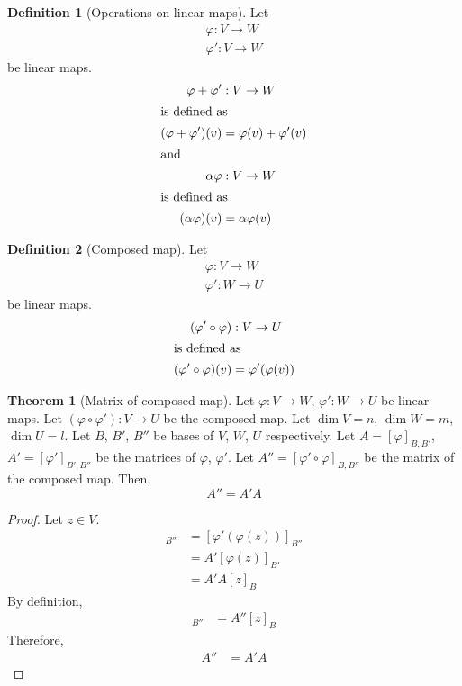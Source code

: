 \documentclass[fleqn, a4paper, 12pt]{article}
\theoremstyle{definition}
\newtheorem{definition}{Definition} %
\theoremstyle{theorem}
\newtheorem{theorem}{Theorem} %
\theoremstyle{remark}
\numberwithin{corollary}{theorem}
\numberwithin{equation}{theorem}
\begin{document}
\begin{definition}[Operations on linear maps]
	Let
	\begin{align*}
		\varphi : V \to W\\
		\varphi' : V \to W
	\end{align*}
	be linear maps.
	\begin{align*}
		\varphi + \varphi' &: V \to W\\
		\intertext{is defined as}
		(\varphi + \varphi')(v) &= \varphi(v) + \varphi'(v)\\
		\intertext{and}
		\alpha \varphi &: V \to W\\
		\intertext{is defined as}
		(\alpha \varphi)(v) &= \alpha \varphi(v)
	\end{align*}
\end{definition}

\begin{definition}[Composed map]
	Let
	\begin{align*}
		\varphi : V \to W\\
		\varphi' : W \to U
	\end{align*}
	be linear maps.
	\begin{align*}
	(\varphi' \circ \varphi) &: V \to U\\
	\intertext{is defined as}
	(\varphi' \circ \varphi)(v) &= \varphi'(\varphi(v))
	\end{align*}
\end{definition}

\begin{theorem}[Matrix of composed map]
	Let $\varphi : V \to W$, $\varphi' : W \to U$ be linear maps. Let $(\varphi \circ \varphi') : V \to U$ be the composed map. Let $\dim V = n$, $\dim W = m$, $\dim U = l$. Let $B$, $B'$, $B''$ be bases of $V$, $W$, $U$ respectively. Let $A = [\varphi]_{B, B'}$, $A' = [\varphi']_{B', B''}$ be the matrices of $\varphi$, $\varphi'$. Let $A'' = [\varphi' \circ \varphi]_{B, B''}$ be the matrix of the composed map. Then, 
	\begin{equation*}
		A'' = A' A
	\end{equation*}
\end{theorem}

\begin{proof}
	Let $z \in V$.
	\begin{align*}
		[(\varphi' \circ \varphi)(z)]_{B''} &= [\varphi' (\varphi (z))]_{B''}\\
		&= A' [\varphi (z)]_{B'}\\
		&= A' A [z]_B
	\end{align*}
	By definition,
	\begin{align*}
		[(\varphi' \circ \varphi) (z)]_{B''} &= A'' [z]_B
	\end{align*}
	Therefore,
	\begin{align*}
		A'' &= A' A
	\end{align*}
\end{proof}
\end{document}
